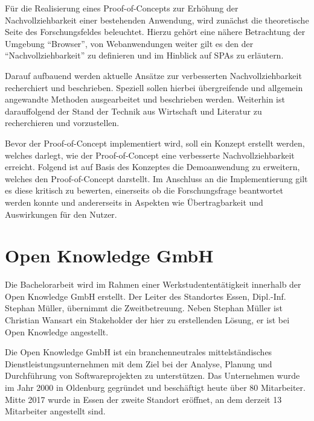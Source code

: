 Für die Realisierung eines Proof-of-Concepts zur Erhöhung der Nachvollziehbarkeit einer bestehenden Anwendung, wird zunächst die theoretische Seite des Forschungsfeldes beleuchtet. Hierzu gehört eine nähere Betrachtung der Umgebung \enquote{Browser}, von Webanwendungen weiter gilt es den der \enquote{Nachvollziehbarkeit} zu definieren und im Hinblick auf SPAs zu erläutern.

Darauf aufbauend werden aktuelle Ansätze zur verbesserten Nachvollziehbarkeit recherchiert und beschrieben. Speziell sollen hierbei übergreifende und allgemein angewandte Methoden ausgearbeitet und beschrieben werden. Weiterhin ist darauffolgend der Stand der Technik aus Wirtschaft und Literatur zu recherchieren und vorzustellen.

Bevor der Proof-of-Concept implementiert wird, soll ein Konzept erstellt werden, welches darlegt, wie der Proof-of-Concept eine verbesserte Nachvollziehbarkeit erreicht. Folgend ist auf Basis des Konzeptes die Demoanwendung zu erweitern, welches den Proof-of-Concept darstellt. Im Anschluss an die Implementierung gilt es diese kritisch zu bewerten, einerseits ob die Forschungsfrage beantwortet werden konnte und andererseits in Aspekten wie Übertragbarkeit und Auswirkungen für den Nutzer.

\vspace{-0.25\baselineskip}

\section{Open Knowledge GmbH}

\vspace{-0.50\baselineskip}

Die Bachelorarbeit wird im Rahmen einer Werkstudententätigkeit innerhalb der Open Knowledge GmbH erstellt. Der Leiter des Standortes Essen, Dipl.-Inf. Stephan Müller, übernimmt die Zweitbetreuung. Neben Stephan Müller ist Christian Wansart ein Stakeholder der hier zu erstellenden Lösung, er ist bei Open Knowledge angestellt.

Die Open Knowledge GmbH ist ein branchenneutrales mittelständisches Dienstleistungsunternehmen mit dem Ziel bei der Analyse, Planung und Durchführung von Softwareprojekten zu unterstützen. Das Unternehmen wurde im Jahr 2000 in Oldenburg gegründet und beschäftigt heute über 80 Mitarbeiter. Mitte 2017 wurde in Essen der zweite Standort eröffnet, an dem derzeit 13 Mitarbeiter angestellt sind.

